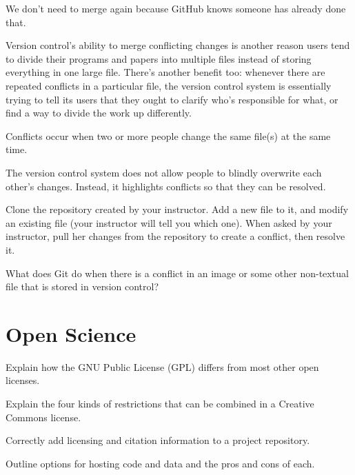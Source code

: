 \documentclass{book}
\begin{document}
We don't need to merge again because GitHub knows someone has already
done that.

Version control's ability to merge conflicting changes is another reason
users tend to divide their programs and papers into multiple files
instead of storing everything in one large file. There's another benefit
too: whenever there are repeated conflicts in a particular file, the
version control system is essentially trying to tell its users that they
ought to clarify who's responsible for what, or find a way to divide the
work up differently.

\begin{keypoints}
\begin{swcitemize}
\item
  Conflicts occur when two or more people change the same file(s) at the
  same time.
\item
  The version control system does not allow people to blindly overwrite
  each other's changes. Instead, it highlights conflicts so that they
  can be resolved.
\end{swcitemize}
\end{keypoints}

\begin{challenge}
  Clone the repository created by your instructor. Add a new file to it,
  and modify an existing file (your instructor will tell you which one).
  When asked by your instructor, pull her changes from the repository to
  create a conflict, then resolve it.
\end{challenge}

\begin{challenge}
  What does Git do when there is a conflict in an image or some other
  non-textual file that is stored in version control?
\end{challenge}

\section{Open Science}

\begin{objectives}
\begin{swcitemize}
\item
  Explain how the GNU Public License (GPL) differs from most other open
  licenses.
\item
  Explain the four kinds of restrictions that can be combined in a
  Creative Commons license.
\item
  Correctly add licensing and citation information to a project
  repository.
\item
  Outline options for hosting code and data and the pros and cons of
  each.
\end{swcitemize}
\end{objectives}
\end{document}

